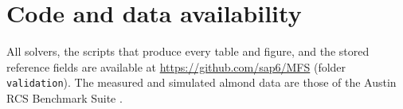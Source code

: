 \documentclass[final,3p,times]{elsarticle}
\begin{document}
\section*{Code and data availability}
All solvers, the scripts that produce every table and figure, and the stored reference fields are available at \url{https://github.com/sap6/MFS} (folder \texttt{validation}). The measured and simulated almond data are those of the Austin RCS Benchmark Suite \cite{kelley2020}.


\appendix




\end{document}
